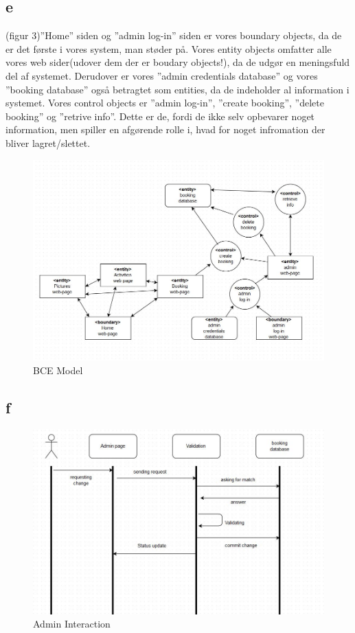 \documentclass[12pt,a4paper]{article}
\begin{document}
\subsection{e}
(figur 3)”Home” siden og ”admin log-in” siden er vores  boundary objects, da de er det første i vores system, man støder på.
Vores entity objects omfatter alle vores web sider(udover dem der er boudary objects!), da de udgør en meningsfuld del af systemet. Derudover er vores ”admin credentials database” og vores ”booking database” også betragtet som entities, da de indeholder al information i systemet.
Vores control objects er ”admin log-in”, ”create booking”, ”delete booking” og ”retrive info”. Dette er de, fordi de ikke selv opbevarer noget information, men spiller en afgørende rolle i, hvad for noget infromation der bliver lagret/slettet. \\
\begin{figure}[H]
\includegraphics[scale=0.6]{BCE.jpg}
\caption{BCE Model}
\end{figure}

\subsection{f}

\begin{figure}[H]
\includegraphics[scale=0.4]{adminInteraction.jpg}
\caption{Admin Interaction}
\end{figure}
\end{document}
